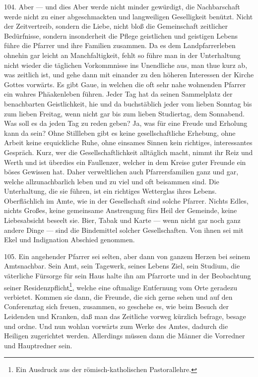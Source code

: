 104. Aber — und dies Aber werde nicht minder gewürdigt, die Nachbarschaft werde nicht zu einer abgeschmackten und langweiligen Geselligkeit benützt. Nicht der Zeitvertreib, sondern die Liebe, nicht bloß die Gemeinschaft zeitlicher Bedürfnisse, sondern insonderheit die Pflege geistlichen und geistigen Lebens führe die Pfarrer und ihre Familien zusammen. Da es dem Landpfarrerleben ohnehin gar leicht an Manchfaltigkeit, fehlt so führe man in der Unterhaltung nicht wieder die täglichen Vorkommnisse ins Unendliche aus, man thue kurz ab, was zeitlich ist, und gehe dann mit einander zu den höheren Interessen der Kirche Gottes vorwärts. Es gibt Gaue, in welchen die oft sehr nahe wohnenden Pfarrer ein wahres Phäakenleben führen. Jeder Tag hat da seinen Sammelplatz der benachbarten Geistlichkeit, hie und da buchstäblich jeder vom lieben Sonntag bis zum lieben Freitag, wenn nicht gar bis zum lieben Studiertag, dem Sonnabend. Was soll es da jeden Tag zu reden geben? Ja, was für eine Freude und Erholung kann da sein? Ohne Stillleben gibt es keine gesellschaftliche Erhebung, ohne Arbeit keine erquickliche Ruhe, ohne
einsames Sinnen kein richtiges, interessantes Gespräch. Kurz, wer die Gesellschaftlichkeit alltäglich macht, nimmt ihr Reiz und Werth und ist überdies ein Faullenzer, welcher in dem Kreise guter Freunde ein böses Gewissen hat. Daher verweltlichen auch Pfarrersfamilien ganz und gar, welche allzunachbarlich leben und zu viel und oft beisammen sind. Die Unterhaltung, die sie führen, ist ein richtiges Wetterglas ihres Lebens. Oberflächlich im Amte, wie in der Gesellschaft sind solche Pfarrer. Nichts Edles, nichts Großes, keine gemeinsame Anstrengung fürs Heil der Gemeinde, keine Liebesabsicht beseelt sie. Bier, Tabak und Karte — wenn nicht gar noch ganz andere Dinge — sind die Bindemittel solcher Gesellschaften. Von ihnen sei mit Ekel und Indignation Abschied genommen.

105. Ein angehender Pfarrer sei selten, aber dann von ganzem Herzen bei seinem Amtsnachbar. Sein Amt, sein Tagewerk, seines Lebens Ziel, sein Studium, die väterliche Fürsorge für sein Haus halte ihn am Pfarrorte und in der Beobachtung seiner Residenzpflicht\footnote{Ein Ausdruck aus der römisch-katholischen Pastorallehre.}, welche eine oftmalige Entfernung vom Orte geradezu verbietet. Kommen sie dann, die Freunde, die sich gerne sehen und auf den Conferenztag sich freuen, zusammen, so geschehe es, wie beim Besuch der Leidenden und Kranken, daß man das Zeitliche vorweg kürzlich befrage, besage und ordne. Und nun wohlan vorwärts zum Werke des Amtes, dadurch die Heiligen zugerichtet werden. Allerdings müssen dann die Männer die Vorredner und Hauptredner sein.


